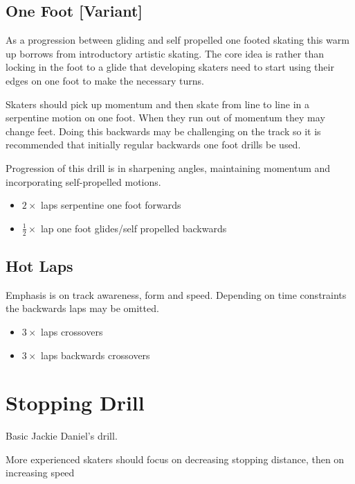 \documentclass{journal}
\begin{document}
\subsection*{One Foot [Variant]}
\label{drill:one_foot:serpentine}
As a progression between gliding and self propelled one footed skating this warm up borrows from introductory artistic skating.
The core idea is rather than locking in the foot to a glide that developing skaters need to start using their edges on one foot to make the necessary turns.     

Skaters should pick up momentum and then skate from line to line in a serpentine motion on one foot. When they run out of momentum they may change feet. Doing this backwards may be challenging on the track so it is recommended that initially regular backwards one foot drills be used. 

Progression of this drill is in sharpening angles, maintaining momentum and incorporating self-propelled motions.  
\begin{itemize}
    \item $2\times$ laps serpentine one foot forwards 
    \item $\frac{1}{2}\times$ lap one foot glides/self propelled backwards 
\end{itemize}

\subsection*{Hot Laps}

Emphasis is on track awareness, form and speed.
Depending on time constraints the backwards laps may be omitted.

\begin{itemize}
    \item $3\times$ laps crossovers 
    \item $3\times$ laps backwards crossovers 
\end{itemize}


\section*{Stopping Drill}
\label{drill:stopping:jackie_daniels}
Basic Jackie Daniel's drill.

More experienced skaters should focus on decreasing stopping distance, then on increasing speed
\end{document}

